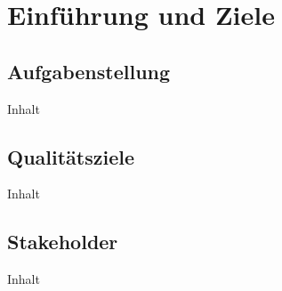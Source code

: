 \chapter{Einführung und Ziele\label{chap1:Erstes-Kapitel}}

\section{Aufgabenstellung\label{sec1.1:Unterpunkt-1}}

Inhalt

\section{Qualitätsziele \label{sec1.2:Unterpunkt-2}}

Inhalt

\section{Stakeholder  \label{sec1.3:Unterpunkt-3}}

Inhalt